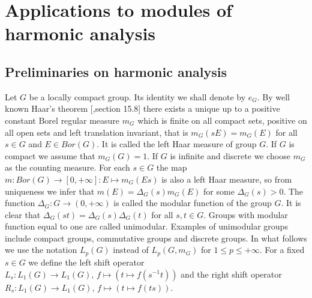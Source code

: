 
\section{
    Applications to modules of harmonic analysis}\label{
SectionApplicationsToModulesOfHarmonicAnalysis}


\subsection{
    Preliminaries on harmonic analysis}\label{
SectionPreliminariesOnHarmonicAnalysis} 

Let $G$ be a locally compact group. Its identity we shall denote by $e_G$. By
well known Haar's theorem [\cite{HewRossAbstrHarmAnalVol1},section 15.8] there
exists a unique up to a positive constant Borel regular measure $m_G$ which is
finite on all compact sets, positive on all open sets and left translation
invariant, that is $m_G(sE)=m_G(E)$ for all $s\in G$ and $E\in Bor(G)$. It is
called the left Haar measure of group $G$. If $G$ is compact we assume that 
$m_G(G)=1$. If $G$ is infinite and discrete we choose $m_G$ as the counting measure.
For each $s\in G$ the map $m:Bor(G)\to[0,+\infty]:E\mapsto m_G(Es)$ is also a
left Haar measure, so from uniqueness we infer that $m(E)=\Delta_G(s)m_G(E)$ for
some $\Delta_G(s)>0$. The function $\Delta_G:G\to(0,+\infty)$ is called the
modular function of the group $G$. It is clear that
$\Delta_G(st)=\Delta_G(s)\Delta_G(t)$ for all $s,t\in G$. Groups with modular
function equal to one are called unimodular. Examples of unimodular groups 
include compact groups, commutative groups and discrete groups. In what
follows we use the notation $L_p(G)$ instead of $L_p(G,m_G)$ 
for $1\leq p\leq+\infty$. For a fixed $s\in G$ we define the left shift operator
$L_s:L_1(G)\to L_1(G),\, f\mapsto(t\mapsto f(s^{-1}t))$ and the right shift
operator $R_s:L_1(G)\to L_1(G),\, f\mapsto (t\mapsto f(ts))$. 

